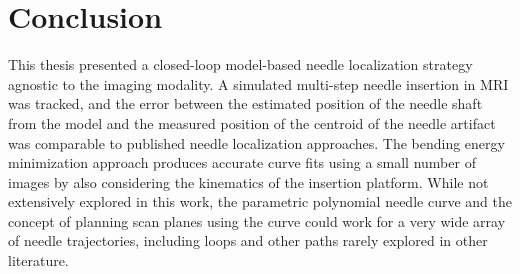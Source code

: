 \section{Conclusion}
This thesis presented a closed-loop model-based needle localization strategy agnostic to the imaging modality. A simulated multi-step needle insertion in MRI was tracked, and the error between the estimated position of the needle shaft from the model and the measured position of the centroid of the needle artifact was comparable to published needle localization approaches. The bending energy minimization approach produces accurate curve fits using a small number of  images by also considering the kinematics of the insertion platform. While not extensively explored in this work, the parametric polynomial needle curve and the concept of planning scan planes using the curve could work for a very wide array of needle trajectories, including loops and other paths rarely explored in other literature.



